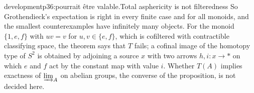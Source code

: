 \begin{dcomment}{development}{p36:pourrait être valable.}{Total asphericity is not filteredness}
So Grothendieck's expectation is right in every finite case and for all monoids, and the smallest counterexamples have infinitely many objects. For the monoid $\{1,e,f\}$ with $uv=v$ for $u,v\in\{e,f\}$, which is cofiltered with contractible classifying space, the theorem says that $T$ fails; a cofinal image of the homotopy type of $S^2$ is obtained by adjoining a source $x$ with two arrows $h,i:x\to*$ on which $e$ and $f$ act by the constant map with value $i$. Whether $T(A)$ implies exactness of $\varinjlim_A$ on abelian groups, the converse of the proposition, is not decided here.
\end{dcomment}
